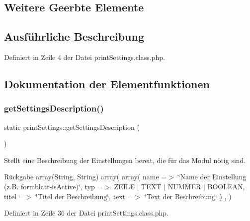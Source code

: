 \subsection*{Weitere Geerbte Elemente}


\subsection{Ausführliche Beschreibung}


Definiert in Zeile 4 der Datei print\+Settings.\+class.\+php.



\subsection{Dokumentation der Elementfunktionen}
\mbox{\label{classprint_settings_a92bf3ffd39fc32c40aedaa042f069e53}} 
\subsubsection{\texorpdfstring{get\+Settings\+Description()}{getSettingsDescription()}}
{\footnotesize\ttfamily static print\+Settings\+::get\+Settings\+Description (\begin{DoxyParamCaption}{ }\end{DoxyParamCaption})\hspace{0.3cm}{\ttfamily [static]}}

Stellt eine Beschreibung der Einstellungen bereit, die für das Modul nötig sind. \begin{DoxyReturn}{Rückgabe}
array(\+String, String) array( array( \textquotesingle{}name\textquotesingle{} =$>$ \char`\"{}\+Name der Einstellung (z.\+B. formblatt-\/is\+Active)\char`\"{}, \textquotesingle{}typ\textquotesingle{} =$>$ Z\+E\+I\+LE $\vert$ T\+E\+XT $\vert$ N\+U\+M\+M\+ER $\vert$ B\+O\+O\+L\+E\+AN, \textquotesingle{}titel\textquotesingle{} =$>$ \char`\"{}\+Titel der Beschreibung\char`\"{}, \textquotesingle{}text\textquotesingle{} =$>$ \char`\"{}\+Text der Beschreibung\char`\"{} ) , ) 
\end{DoxyReturn}


Definiert in Zeile 36 der Datei print\+Settings.\+class.\+php.

\mbox{\label{classprint_settings_abc2930e1c62b9a046e668913de24b29c}} 
